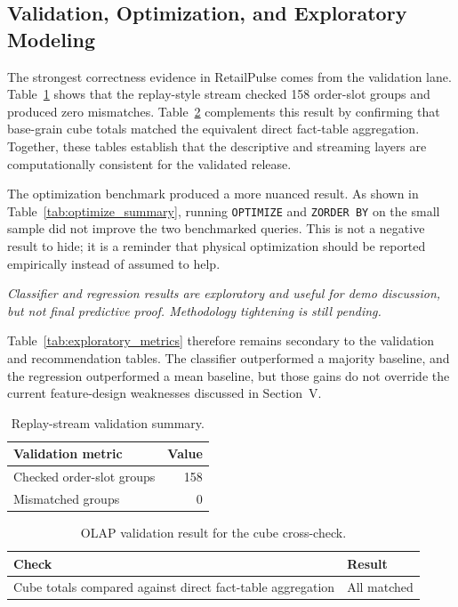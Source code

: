 \documentclass[journal]{IEEEtran}
\begin{document}
\subsection{Validation, Optimization, and Exploratory Modeling}
The strongest correctness evidence in RetailPulse comes from the validation lane. Table~\ref{tab:stream_validation} shows that the replay-style stream checked 158 order-slot groups and produced zero mismatches. Table~\ref{tab:olap_validation} complements this result by confirming that base-grain cube totals matched the equivalent direct fact-table aggregation. Together, these tables establish that the descriptive and streaming layers are computationally consistent for the validated release.

The optimization benchmark produced a more nuanced result. As shown in Table~\ref{tab:optimize_summary}, running \texttt{OPTIMIZE} and \texttt{ZORDER BY} on the small sample did not improve the two benchmarked queries. This is not a negative result to hide; it is a reminder that physical optimization should be reported empirically instead of assumed to help.

\textit{Classifier and regression results are exploratory and useful for demo discussion, but not final predictive proof. Methodology tightening is still pending.}

Table~\ref{tab:exploratory_metrics} therefore remains secondary to the validation and recommendation tables. The classifier outperformed a majority baseline, and the regression outperformed a mean baseline, but those gains do not override the current feature-design weaknesses discussed in Section~V.

\begin{table}[!t]
\caption{Replay-stream validation summary.}
\label{tab:stream_validation}
\centering
\footnotesize
\begin{tabular}{p{4.5cm} r}
\toprule
\textbf{Validation metric} & \textbf{Value} \\
\midrule
Checked order-slot groups & 158 \\
Mismatched groups & 0 \\
\bottomrule
\end{tabular}
\end{table}

\begin{table}[!t]
\caption{OLAP validation result for the cube cross-check.}
\label{tab:olap_validation}
\centering
\footnotesize
\begin{tabular}{p{4.8cm} p{1.9cm}}
\toprule
\textbf{Check} & \textbf{Result} \\
\midrule
Cube totals compared against direct fact-table aggregation & All matched \\
\bottomrule
\end{tabular}
\end{table}
\end{document}
